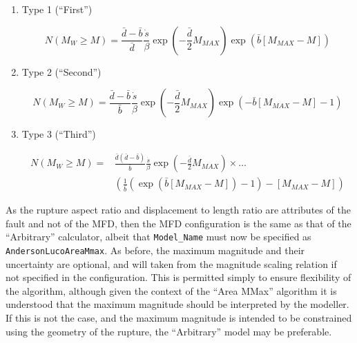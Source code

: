 \begin{enumerate}

\item Type 1 (``First'')

\begin{equation}
N \left( {M_W \geq M} \right) = \frac{\bar{d} - \bar{b}}{\bar{d}} \frac{\dot{s}}{\beta} \exp \left( {-\frac{\bar{d}}{2} M_{MAX}} \right) \exp \left( {\bar{b} \left[ {M_{MAX} - M} \right]} \right)
\end{equation}


\item Type 2 (``Second'')

\begin{equation}
N \left( {M_W \geq M} \right) = \frac{\bar{d} - \bar{b}}{\bar{b}}  \frac{\dot{s}}{\beta} \exp \left( {-\frac{\bar{d}}{2} M_{MAX}} \right)  \exp \left( {-\bar{b} \left[ {M_{MAX} - M} \right] - 1} \right)
\end{equation}

\item Type 3 (``Third'')

\begin{equation}
\begin{split}
N \left( {M_W \geq M} \right) = & \frac{\bar{d} \left( {\bar{d} - \bar{b}} \right)}{\bar{b}} \frac{\dot{s}}{\beta} \exp \left( {-\frac{\bar{d}}{2} M_{MAX}} \right) \times \ldots \\ 
& \left( {\frac{1}{\bar{b}} \left( {\exp \left( {\bar{b} \left[ {M_{MAX} - M} \right]} \right) - 1} \right) - \left[ {M_{MAX} - M} \right]} \right)
\end{split}
\end{equation}

\end{enumerate}

As the rupture aspect ratio and displacement to length ratio are attributes of the fault and not of the MFD, then the MFD configuration is the same as that of the \textcite{AndersonLuco1983} ``Arbitrary'' calculator, albeit that \verb=Model_Name= must now be specified as \verb=AndersonLucoAreaMmax=. As before, the maximum magnitude and their uncertainty are optional, and will taken from the magnitude scaling relation if not specified in the configuration. This is permitted simply to ensure flexibility of the algorithm, although given the context of the ``Area MMax'' algorithm it is understood that the maximum magnitude should be interpreted by the modeller. If this is not the case, and the maximum magnitude is intended to be constrained using the geometry of the rupture, the ``Arbitrary'' model may be preferable.

